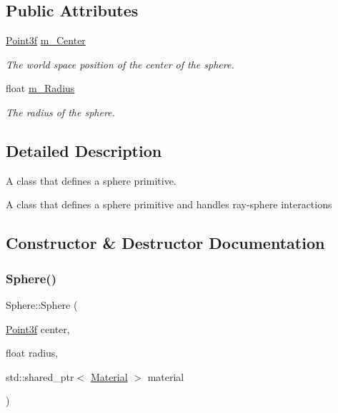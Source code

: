\subsection*{Public Attributes}
\begin{DoxyCompactItemize}
\item 
\mbox{\label{class_sphere_a67a24eee9316de96160185cc024a952e}} 
\mbox{\hyperlink{class_point}{Point3f}} \mbox{\hyperlink{class_sphere_a67a24eee9316de96160185cc024a952e}{m\+\_\+\+Center}}
\begin{DoxyCompactList}\small\item\em The world space position of the center of the sphere. \end{DoxyCompactList}\item 
\mbox{\label{class_sphere_a013e6356f37b24bddda33ff36bfdcd76}} 
float \mbox{\hyperlink{class_sphere_a013e6356f37b24bddda33ff36bfdcd76}{m\+\_\+\+Radius}}
\begin{DoxyCompactList}\small\item\em The radius of the sphere. \end{DoxyCompactList}\end{DoxyCompactItemize}


\subsection{Detailed Description}
A class that defines a sphere primitive. 

A class that defines a sphere primitive and handles ray-\/sphere interactions 

\subsection{Constructor \& Destructor Documentation}
\mbox{\label{class_sphere_addbe505252c330f303acbaed75a44b35}} 
\subsubsection{\texorpdfstring{Sphere()}{Sphere()}}
{\footnotesize\ttfamily Sphere\+::\+Sphere (\begin{DoxyParamCaption}\item[{\mbox{\hyperlink{class_point}{Point3f}}}]{center,  }\item[{float}]{radius,  }\item[{std\+::shared\+\_\+ptr$<$ \mbox{\hyperlink{class_material}{Material}} $>$}]{material }\end{DoxyParamCaption})\hspace{0.3cm}{\ttfamily [inline]}}



